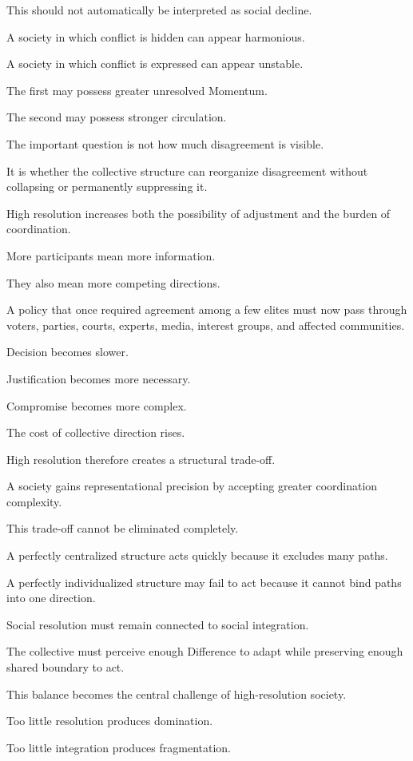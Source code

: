 This should not automatically be interpreted as social decline.

A society in which conflict is hidden can appear harmonious.

A society in which conflict is expressed can appear unstable.

The first may possess greater unresolved Momentum.

The second may possess stronger circulation.

The important question is not how much disagreement is visible.

It is whether the collective structure can reorganize disagreement without collapsing or permanently suppressing it.

High resolution increases both the possibility of adjustment and the burden of coordination.

More participants mean more information.

They also mean more competing directions.

A policy that once required agreement among a few elites must now pass through voters, parties, courts, experts, media, interest groups, and affected communities.

Decision becomes slower.

Justification becomes more necessary.

Compromise becomes more complex.

The cost of collective direction rises.

High resolution therefore creates a structural trade-off.

A society gains representational precision by accepting greater coordination complexity.

This trade-off cannot be eliminated completely.

A perfectly centralized structure acts quickly because it excludes many paths.

A perfectly individualized structure may fail to act because it cannot bind paths into one direction.

Social resolution must remain connected to social integration.

The collective must perceive enough Difference to adapt while preserving enough shared boundary to act.

This balance becomes the central challenge of high-resolution society.

Too little resolution produces domination.

Too little integration produces fragmentation.


